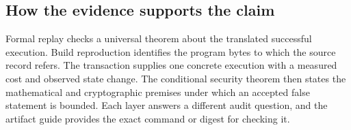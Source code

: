 \subsection{How the evidence supports the claim}

Formal replay checks a universal theorem about the translated successful
execution.  Build reproduction identifies the program bytes to which the
source record refers.  The transaction supplies one concrete execution with a
measured cost and observed state change.  The conditional security theorem
then states the mathematical and cryptographic premises under which an
accepted false statement is bounded.  Each layer answers a different audit
question, and the artifact guide provides the exact command or digest for
checking it.
